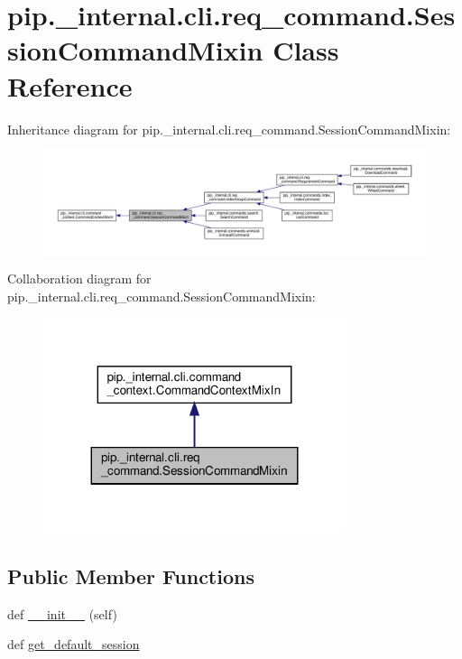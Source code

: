 \hypertarget{classpip_1_1__internal_1_1cli_1_1req__command_1_1SessionCommandMixin}{}\section{pip.\+\_\+internal.\+cli.\+req\+\_\+command.\+Session\+Command\+Mixin Class Reference}
\label{classpip_1_1__internal_1_1cli_1_1req__command_1_1SessionCommandMixin}


Inheritance diagram for pip.\+\_\+internal.\+cli.\+req\+\_\+command.\+Session\+Command\+Mixin\+:
\nopagebreak
\begin{figure}[H]
\begin{center}
\leavevmode
\includegraphics[width=350pt]{classpip_1_1__internal_1_1cli_1_1req__command_1_1SessionCommandMixin__inherit__graph}
\end{center}
\end{figure}


Collaboration diagram for pip.\+\_\+internal.\+cli.\+req\+\_\+command.\+Session\+Command\+Mixin\+:
\nopagebreak
\begin{figure}[H]
\begin{center}
\leavevmode
\includegraphics[width=251pt]{classpip_1_1__internal_1_1cli_1_1req__command_1_1SessionCommandMixin__coll__graph}
\end{center}
\end{figure}
\subsection*{Public Member Functions}
\begin{DoxyCompactItemize}
\item 
def \hyperlink{classpip_1_1__internal_1_1cli_1_1req__command_1_1SessionCommandMixin_a33bdab8b8e3cc2e615346504188632a5}{\+\_\+\+\_\+init\+\_\+\+\_\+} (self)
\item 
def \hyperlink{classpip_1_1__internal_1_1cli_1_1req__command_1_1SessionCommandMixin_a6baad5ba9f10b7c6692a007dbb2b1c87}{get\+\_\+default\+\_\+session}
\end{DoxyCompactItemize}
